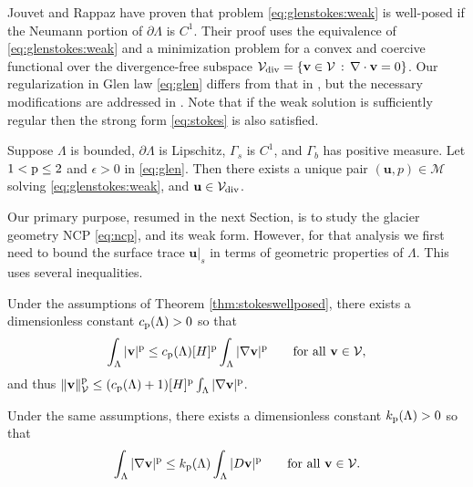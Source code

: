 \documentclass[hidelinks,onefignum,onetabnum,final]{siamart220329}  %
\newcommand{\eps}{\epsilon}
\newcommand{\grad}{\nabla}
\newcommand{\Div}{\nabla\cdot}
\newcommand{\bu}{\mathbf{u}}
\newcommand{\bv}{\mathbf{v}}
\newcommand{\cV}{\mathcal{V}}
\newcommand{\pp}{{\text{\textnormal{p}}}}
\newcommand{\Vdiv}{\cV_{\text{\textnormal{div}}}}
\begin{document}
Jouvet and Rappaz \cite{JouvetRappaz2011} have proven that problem \eqref{eq:glenstokes:weak} is well-posed if the Neumann portion of $\partial\Lambda$ is $C^1$.  Their proof uses the equivalence of \eqref{eq:glenstokes:weak} and a minimization problem for a convex and coercive functional over the divergence-free subspace $\Vdiv = \{\bv\in\cV\,:\,\Div\bv=0\}$.  Our regularization in Glen law \eqref{eq:glen} differs from that in \cite{JouvetRappaz2011}, but the necessary modifications are addressed in \cite{Belenkietal2012,IsaacStadlerGhattas2015}.  Note that if the weak solution is sufficiently regular then the strong form \eqref{eq:stokes} is also satisfied.

\begin{theorem} \label{thm:stokeswellposed}  Suppose $\Lambda$ is bounded, $\partial\Lambda$ is Lipschitz, $\Gamma_s$ is $C^1$, and $\Gamma_b$ has positive measure.  Let $1<\pp\le 2$ and $\eps>0$ in \eqref{eq:glen}.  Then there exists a unique pair $(\bu,p) \in \mathcal{M}$ solving \eqref{eq:glenstokes:weak}, and $\bu\in \Vdiv$.
\end{theorem}

Our primary purpose, resumed in the next Section, is to study the glacier geometry NCP \eqref{eq:ncp}, and its weak form.  However, for that analysis we first need to bound the surface trace $\bu|_s$ in terms of geometric properties of $\Lambda$.  This uses several inequalities.

\begin{lemma} \label{lem:poincare}
Under the assumptions of Theorem \ref{thm:stokeswellposed}, there exists a dimensionless constant $c_{\pp}(\Lambda)>0$ so that
\begin{equation}
\int_\Lambda |\bv|^\pp \le c_{\pp}(\Lambda) [H]^\pp \int_\Lambda |\grad\bv|^\pp \qquad \text{for all } \bv \in \cV, \label{eq:poincare}
\end{equation}
and thus $\|\bv\|_{\cV}^\pp \le (c_{\pp}(\Lambda) + 1) [H]^\pp \int_\Lambda |\grad\bv|^\pp$.
\end{lemma}
 
\begin{lemma} \label{lem:korns}
Under the same assumptions, there exists a dimensionless constant $k_{\pp}(\Lambda)>0$ so that
\begin{equation}
\int_\Lambda |\grad\bv|^\pp \le k_{\pp}(\Lambda) \int_\Lambda |D\bv|^\pp \qquad \text{for all } \bv \in \cV. \label{eq:korns}
\end{equation}
\end{lemma}
\end{document}
